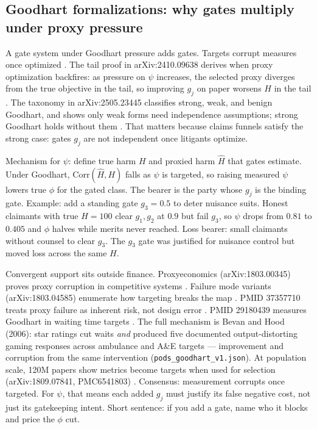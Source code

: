\documentclass[11pt]{article}
\begin{document}
\subsection{Goodhart formalizations: why gates multiply under proxy pressure}

A gate system under Goodhart pressure adds gates. Targets corrupt measures once optimized \citep{goodhart2410,goodhart2505}. The tail proof in arXiv:2410.09638 derives when proxy optimization backfires: as pressure on $\psi$ increases, the selected proxy diverges from the true objective in the tail, so improving $g_j$ on paper worsens $H$ in the tail \citep{goodhart2410}. The taxonomy in arXiv:2505.23445 classifies strong, weak, and benign Goodhart, and shows only weak forms need independence assumptions; strong Goodhart holds without them \citep{goodhart2505}. That matters because claims funnels satisfy the strong case: gates $g_j$ are not independent once litigants optimize.

Mechanism for $\psi$: define true harm $H$ and proxied harm $\hat H$ that gates estimate. Under Goodhart, $\mathrm{Corr}(\hat H,H)$ falls as $\psi$ is targeted, so raising measured $\psi$ lowers true $\phi$ for the gated class. The bearer is the party whose $g_j$ is the binding gate. Example: add a standing gate $g_3=0.5$ to deter nuisance suits. Honest claimants with true $H=100$ clear $g_1,g_2$ at $0.9$ but fail $g_3$, so $\psi$ drops from $0.81$ to $0.405$ and $\phi$ halves while merits never reached. Loss bearer: small claimants without counsel to clear $g_3$. The $g_3$ gate was justified for nuisance control but moved loss across the same $H$.

Convergent support sits outside finance. Proxyeconomics (arXiv:1803.00345) proves proxy corruption in competitive systems \citep{proxyeconomics2018}. Failure mode variants (arXiv:1803.04585) enumerate how targeting breaks the map \citep{goodhartvariants2018}. PMID 37357710 treats proxy failure as inherent risk, not design error \citep{chen2023}. PMID 29180439 measures Goodhart in waiting time targets \citep{bevan2017}. The full mechanism is Bevan and Hood (2006): star ratings cut waits \textit{and} produced five documented output-distorting gaming responses across ambulance and A\&E targets --- improvement and corruption from the same intervention (\texttt{pods\_goodhart\_v1.json}). At population scale, 120M papers show metrics become targets when used for selection (arXiv:1809.07841, PMC6541803) \citep{fire2018,edwards2017}. Consensus: measurement corrupts once targeted. For $\psi$, that means each added $g_j$ must justify its false negative cost, not just its gatekeeping intent. Short sentence: if you add a gate, name who it blocks and price the $\phi$ cut.
\end{document}
